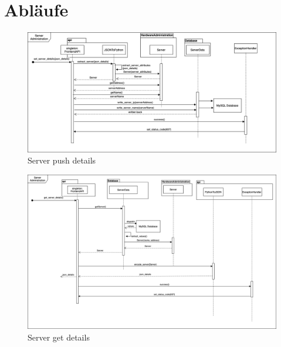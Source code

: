 \section{Abläufe}

\begin{figure}[h]
    \includegraphics[width=1\textwidth]{res/Server_Sequence.drawio.png} 
    \caption{Server push details}
\end{figure}
\begin{figure}[h]
    \includegraphics[width=1\textwidth]{res/server_get.png} 
    \caption{Server get details}
\end{figure}
\newpage

\newpage